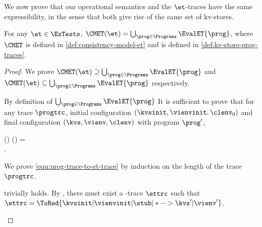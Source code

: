 We now prove that our operational semantics and the \(\et \)-traces have the same expressibility,
in the sense that both give rise of the same set of kv-stores.

\begin{toappendix}
\label{sec:proof-equivalent-expressibility}
\end{toappendix}
\begin{theoremrep}
\label{thm:ettrc-et-prog}
For any \(\et \in \ExTests\), \(\CMET(\et) = \bigcup_{\prog \in \Programs} \EvalET{\prog}\),
where \(\CMET \) is defined in \cref{def:consistency-model-et} 
and \EvalET{\prog} is defined in \cref{def:kv-store-prog-traces}.
\end{theoremrep}
\begin{proof}
We prove \( \CMET(\et) \supseteq \bigcup_{\prog \in \Programs} \EvalET{\prog} \)
and \( \CMET(\et) \subseteq \bigcup_{\prog \in \Programs} \EvalET{\prog} \) respectively.
\begin{enumerate}
\Case{\(\bigcup_{\prog \in \Programs} \EvalET{\prog} \subseteq \CMET(\et)\)}
    By definition of \( \bigcup_{\prog \in \Programs} \EvalET{\prog} \) It is sufficient to prove that
    for any trace \( \progtrc \), 
    initial configuration \( (\kvsinit,\vienvinit, \clenv_0) \) and 
    final configuration \( (\kvs, \vienv, \clenv) \) with program \( \prog' \),
    \begin{Formulae}
    \begin{Formula}
    \Dom(\prog) \subseteq \Dom(\clenv) 
    \land \progtrc = 
    \\ \implies {}.
    \label{equ:prog-trace-to-et-trace}
    \end{Formula}
    \end{Formulae}
    We prove \cref{equ:prog-trace-to-et-trace} by induction on the length of the trace \( \progtrc \).
    \begin{enumerate}
         trivially holds.
        By \ih, there must exist a \et-trace \( \ettrc \) such that 
        \( \ettrc =  \ToRed{\kvsinit | \vienvinit | \stub | * -> \kvs' | \vienv'} \).

\end{enumerate}
\end{enumerate}
\end{proof}
